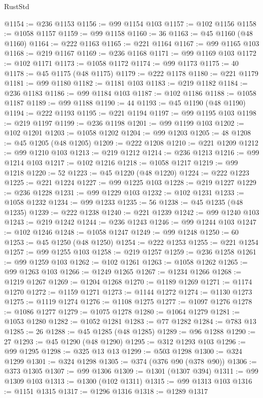 \begin{lexlean}{RustStd}
\begin{coremodule}
@1154 := @236 @1153
@1156 := @99 @1154 @103
@1157 := @102 @1156
@1158 := @1058 @1157
@1159 := @99 @1158
@1160 := 36
@1163 := @45 @1160 (@48 @1160)
@1164 := @222 @1163
@1165 := @221 @1164
@1167 := @99 @1165 @103
@1168 := @219 @1167
@1169 := @236 @1168
@1171 := @99 @1169 @103
@1172 := @102 @1171
@1173 := @1058 @1172
@1174 := @99 @1173
@1175 := 40
@1178 := @45 @1175 (@48 @1175)
@1179 := @222 @1178
@1180 := @221 @1179
@1181 := @99 @1180
@1182 := @1181 @103
@1183 := @219 @1182
@1184 := @236 @1183
@1186 := @99 @1184 @103
@1187 := @102 @1186
@1188 := @1058 @1187
@1189 := @99 @1188
@1190 := 44
@1193 := @45 @1190 (@48 @1190)
@1194 := @222 @1193
@1195 := @221 @1194
@1197 := @99 @1195 @103
@1198 := @219 @1197
@1199 := @236 @1198
@1201 := @99 @1199 @103
@1202 := @102 @1201
@1203 := @1058 @1202
@1204 := @99 @1203
@1205 := 48
@1208 := @45 @1205 (@48 @1205)
@1209 := @222 @1208
@1210 := @221 @1209
@1212 := @99 @1210 @103
@1213 := @219 @1212
@1214 := @236 @1213
@1216 := @99 @1214 @103
@1217 := @102 @1216
@1218 := @1058 @1217
@1219 := @99 @1218
@1220 := 52
@1223 := @45 @1220 (@48 @1220)
@1224 := @222 @1223
@1225 := @221 @1224
@1227 := @99 @1225 @103
@1228 := @219 @1227
@1229 := @236 @1228
@1231 := @99 @1229 @103
@1232 := @102 @1231
@1233 := @1058 @1232
@1234 := @99 @1233
@1235 := 56
@1238 := @45 @1235 (@48 @1235)
@1239 := @222 @1238
@1240 := @221 @1239
@1242 := @99 @1240 @103
@1243 := @219 @1242
@1244 := @236 @1243
@1246 := @99 @1244 @103
@1247 := @102 @1246
@1248 := @1058 @1247
@1249 := @99 @1248
@1250 := 60
@1253 := @45 @1250 (@48 @1250)
@1254 := @222 @1253
@1255 := @221 @1254
@1257 := @99 @1255 @103
@1258 := @219 @1257
@1259 := @236 @1258
@1261 := @99 @1259 @103
@1262 := @102 @1261
@1263 := @1058 @1262
@1265 := @99 @1263 @103
@1266 := @1249 @1265
@1267 := @1234 @1266
@1268 := @1219 @1267
@1269 := @1204 @1268
@1270 := @1189 @1269
@1271 := @1174 @1270
@1272 := @1159 @1271
@1273 := @1144 @1272
@1274 := @1130 @1273
@1275 := @1119 @1274
@1276 := @1108 @1275
@1277 := @1097 @1276
@1278 := @1086 @1277
@1279 := @1075 @1278
@1280 := @1064 @1279
@1281 := @1053 @1280
@1282 := @1052 @1281
@1283 := @77 @1282
@1284 := @783 @13
@1285 := 26
@1288 := @45 @1285 (@48 @1285)
@1289 := @96 @1288
@1290 := 27
@1293 := @45 @1290 (@48 @1290)
@1295 := @312 @1293 @103
@1296 := @99 @1295
@1298 := @325 @13 @13
@1299 := @503 @1298
@1300 := @324 @1299
@1301 := @324 @1298
@1305 := @374 (@376 @90 (@378 @90))
@1306 := @373 @1305
@1307 := @99 @1306
@1309 := @1301 (@1307 @394)
@1311 := @99 @1309 @103
@1313 := @1300 (@102 @1311)
@1315 := @99 @1313 @103
@1316 := @1151 @1315
@1317 := @1296 @1316
@1318 := @1289 @1317

\end{coremodule}
\end{lexlean}
